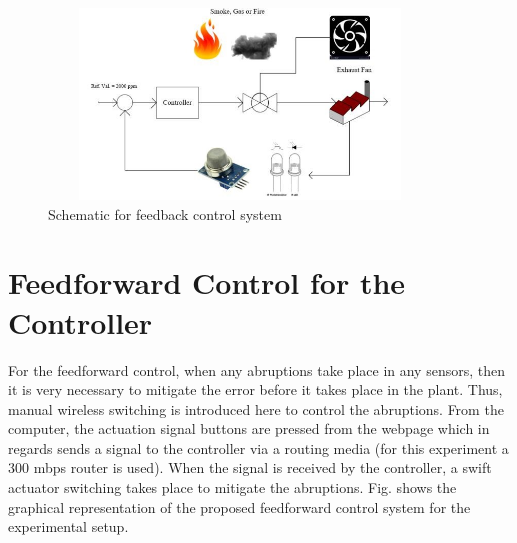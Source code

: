 
\begin{figure}[H]
	\begin{Center}
		\includegraphics[width=4in,height=2in]{33}
		\caption{Schematic for feedback control system}
		\label{fig:_19_Schematic_for_feedback_control_system}
	\end{Center}
\end{figure}



\par

\par

\section{Feedforward Control for the Controller }
\begin{justify}
For the feedforward control, when any abruptions take place in any sensors, then it is very necessary to mitigate the error before it takes place in the plant. Thus, manual wireless switching is introduced here to control the abruptions. From the computer, the actuation signal buttons are pressed from the webpage which in regards sends a signal to the controller via\textit{ }a routing media (for this experiment a 300 mbps router is used). When the signal is received by the controller, a swift actuator switching takes place to mitigate the abruptions. Fig. shows the graphical representation of the proposed feedforward control system for the experimental setup.
\end{justify}\par




